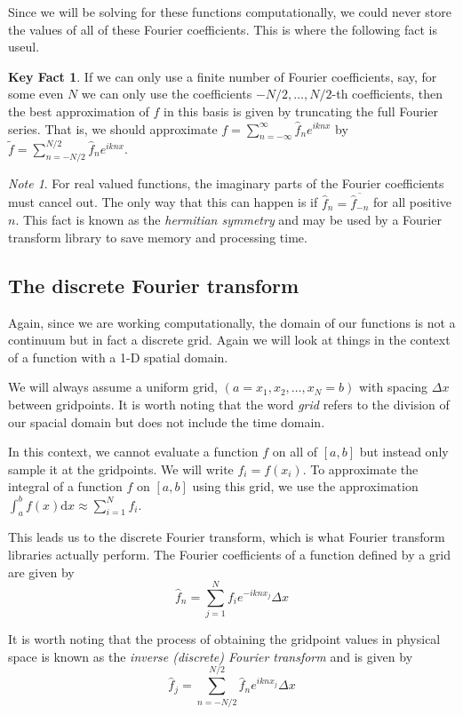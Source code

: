 \documentclass[a4paper,11pt]{article}
\theoremstyle{plain} %
\theoremstyle{remark}
\newtheorem*{note}{Note}
\theoremstyle{definition} %
\newtheorem{fact}{Key Fact}[section]
\renewcommand{\d}{\text{d}}
\begin{document}
Since we will be solving for these functions computationally, we could never store the values of all of these Fourier coefficients. This is where the following fact is useul.

\begin{fact}
If we can only use a finite number of Fourier coefficients, say, for some even $N$ we can only use the coefficients $-N/2, \dots,N/2$-th coefficients, then the best approximation of $f$ in this basis is given by truncating the full Fourier series.
	That is, we should approximate $f=\sum_{n=-\infty}^\infty \widehat{f}_n e^{ikn x}$ by $\tilde{f}=\sum_{n=-N/2}^{N/2} \widehat{f}_n e^{ikn x}$.
\end{fact}

\begin{note}
For real valued functions, the imaginary parts of the Fourier coefficients must cancel out. The only way that this can happen is if $\widehat{f}_n=\overline{\widehat{f}_{-n}}$ for all positive $n$. This fact is known as the \emph{hermitian symmetry} and may be used by a Fourier transform library to save memory and processing time.
\end{note}

\subsection{The discrete Fourier transform}
Again, since we are working computationally, the domain of our functions is not a continuum but in fact a discrete grid. Again we will look at things in the context of a function with a 1-D spatial domain. 

We will always assume a uniform grid, $(a=x_1, x_2, \dots, x_N=b)$ with spacing $\Delta x$ between gridpoints. It is worth noting that the word \emph{grid} refers to the division of our spacial domain but does not include the time domain.

In this context, we cannot evaluate a function $f$ on all of $[a,b]$ but instead only sample it at the gridpoints. We will write $f_i=f(x_i)$. To approximate the integral of a function $f$ on $[a,b]$ using this grid, we use the approximation $\int_a^b f(x) \d x \approx \sum_{i=1}^N f_i$.

This leads us to the discrete Fourier transform, which is what Fourier transform libraries actually perform. The Fourier coefficients of a function defined by a grid are given by
\[
\widehat{f}_n=\sum_{j=1}^N f_i e^{-iknx_j}\Delta x
\]

It is worth noting that the process of obtaining the gridpoint values in physical space is known as the \emph{inverse (discrete) Fourier transform} and is given by
\[
\widehat{f}_j=\sum_{n=-N/2}^{N/2} \widehat{f}_n e^{iknx_j}\Delta x
\]
\end{document}
